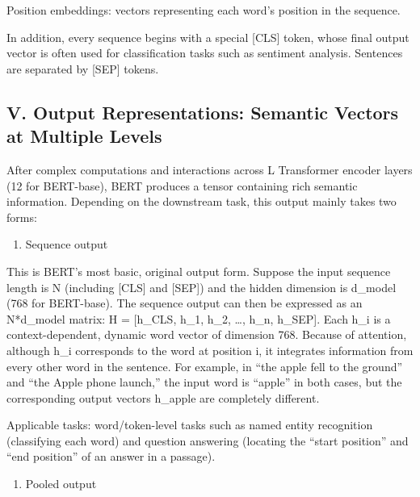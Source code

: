 Position embeddings: vectors representing each word's position in the sequence.

In addition, every sequence begins with a special {[}CLS{]} token, whose final output vector is often used for classification tasks such as sentiment analysis. Sentences are separated by {[}SEP{]} tokens.

\hypertarget{v.-output-representations-semantic-vectors-at-multiple-levels}{%
\subsection{V. Output Representations: Semantic Vectors at Multiple Levels}\label{v.-output-representations-semantic-vectors-at-multiple-levels}}

After complex computations and interactions across L Transformer encoder layers (12 for BERT-base), BERT produces a tensor containing rich semantic information. Depending on the downstream task, this output mainly takes two forms:

\begin{enumerate}
\def\labelenumi{\arabic{enumi}.}
\tightlist
\item
  Sequence output
\end{enumerate}

This is BERT's most basic, original output form. Suppose the input sequence length is N (including {[}CLS{]} and {[}SEP{]}) and the hidden dimension is d\_model (768 for BERT-base). The sequence output can then be expressed as an N*d\_model matrix: H = {[}h\_CLS, h\_1, h\_2, \ldots, h\_n, h\_SEP{]}. Each h\_i is a context-dependent, dynamic word vector of dimension 768. Because of attention, although h\_i corresponds to the word at position i, it integrates information from every other word in the sentence. For example, in ``the apple fell to the ground'' and ``the Apple phone launch,'' the input word is ``apple'' in both cases, but the corresponding output vectors h\_apple are completely different.

Applicable tasks: word/token-level tasks such as named entity recognition (classifying each word) and question answering (locating the ``start position'' and ``end position'' of an answer in a passage).

\begin{enumerate}
\def\labelenumi{\arabic{enumi}.}
\setcounter{enumi}{1}
\tightlist
\item
  Pooled output
\end{enumerate}

